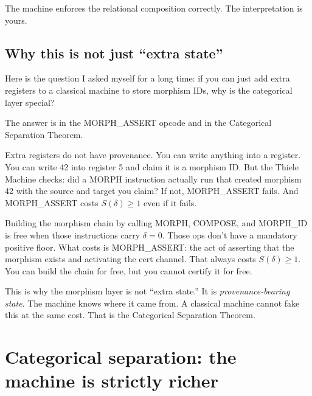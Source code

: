 \documentclass[11pt,a4paper]{article}
\theoremstyle{plain}
\theoremstyle{definition}
\theoremstyle{remark}
\begin{document}
The machine enforces the relational composition correctly. The interpretation is yours.

\subsection{Why this is not just ``extra state''}

Here is the question I asked myself for a long time: if you can just add extra registers to a classical machine to store morphism IDs, why is the categorical layer special?

The answer is in the MORPH\_ASSERT opcode and in the Categorical Separation Theorem.

Extra registers do not have provenance. You can write anything into a register. You can write 42 into register 5 and claim it is a morphism ID. But the Thiele Machine checks: did a MORPH instruction actually run that created morphism 42 with the source and target you claim? If not, MORPH\_ASSERT fails. And MORPH\_ASSERT costs $S(\delta) \geq 1$ even if it fails.

Building the morphism chain by calling MORPH, COMPOSE, and MORPH\_ID is free when those instructions carry $\delta = 0$. Those ops don't have a mandatory positive floor. What costs is MORPH\_ASSERT: the act of asserting that the morphism exists and activating the cert channel. That always costs $S(\delta) \geq 1$. You can build the chain for free, but you cannot certify it for free.

This is why the morphism layer is not ``extra state.'' It is \emph{provenance-bearing state}. The machine knows where it came from. A classical machine cannot fake this at the same cost. That is the Categorical Separation Theorem.

\section{Categorical separation: the machine is strictly richer}
\label{sec:categorical}
\end{document}
